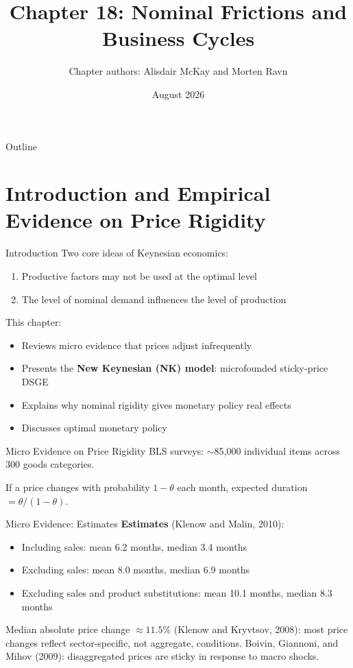 \documentclass[blue]{beamer}
\title[Chapter18]{Chapter 18: Nominal Frictions and Business Cycles}
\author[Alisdair McKay and Morten Ravn]{Chapter authors: Alisdair McKay and Morten Ravn}
\date[August 2026]{August 2026}
\begin{document}
\begin{frame}
\titlepage
\end{frame}

\begin{frame}{Outline}
\tableofcontents
\end{frame}

\section{Introduction and Empirical Evidence on Price Rigidity}

\begin{frame}{Introduction}
Two core ideas of Keynesian economics:
\begin{enumerate}
    \item Productive factors may not be used at the optimal level
    \item The level of nominal demand influences the level of production
\end{enumerate}

\bigskip
This chapter:
\begin{itemize}
    \item Reviews micro evidence that prices adjust infrequently
    \item Presents the \textbf{New Keynesian (NK) model}: microfounded sticky-price DSGE
    \item Explains why nominal rigidity gives monetary policy real effects
    \item Discusses optimal monetary policy
\end{itemize}
\end{frame}

\begin{frame}{Micro Evidence on Price Rigidity}
BLS surveys: $\sim$85,000 individual items across 300 goods categories.

\bigskip
If a price changes with probability $1-\theta$ each month, expected duration $= \theta/(1-\theta)$.

\bigskip
\end{frame}

\begin{frame}{Micro Evidence: Estimates}
\textbf{Estimates} (Klenow and Malin, 2010):
\begin{itemize}
    \item Including sales: mean 6.2 months, median 3.4 months
    \item Excluding sales: mean 8.0 months, median 6.9 months
    \item Excluding sales and product substitutions: mean 10.1 months, median 8.3 months
\end{itemize}

\bigskip
Median absolute price change $\approx 11.5\%$ (Klenow and Kryvtsov, 2008): most price changes reflect sector-specific, not aggregate, conditions. Boivin, Giannoni, and Mihov (2009): disaggregated prices are sticky in response to macro shocks.
\end{frame}
\end{document}
